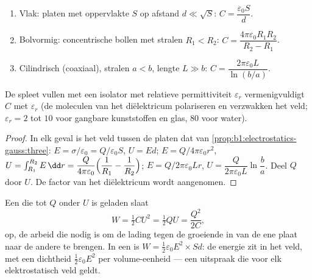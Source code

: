 \begin{proposition}\label{prop:b1:potential-capacitors:three}
\begin{enumerate}
  \item Vlak: platen met oppervlakte $S$ op afstand $d \ll \sqrt S$:
        $C = \dfrac{\varepsilon_0S}{d}$.
  \item Bolvormig: concentrische bollen met stralen $R_1 < R_2$:
        $C = \dfrac{4\pi\varepsilon_0R_1R_2}{R_2 - R_1}$.
  \item Cilindrisch (coaxiaal), stralen $a < b$, lengte $L \gg b$:
        $C = \dfrac{2\pi\varepsilon_0L}{\ln(b/a)}$.
\end{enumerate}
De spleet vullen met een isolator met relatieve permittiviteit
$\varepsilon_r$ vermenigvuldigt $C$ met $\varepsilon_r$ (de moleculen van het diëlektricum
polariseren en verzwakken het veld; $\varepsilon_r = 2$ tot $10$ voor gangbare
kunststoffen en glas, $80$ voor water).
\end{proposition}

\begin{proof}
In elk geval is het veld tussen de platen dat van
\cref{prop:b1:electrostatics-gauss:three}: $E = \sigma/\varepsilon_0 = Q/\varepsilon_0S$,
$U = Ed$; $E = Q/4\pi\varepsilon_0r^2$, $U = \int_{R_1}^{R_2}E\,\dd r = \dfrac{Q}{4\pi\varepsilon_0}
\Bigl(\dfrac1{R_1} - \dfrac1{R_2}\Bigr)$; $E = Q/2\pi\varepsilon_0Lr$, $U =
\dfrac{Q}{2\pi\varepsilon_0L}\ln\dfrac ba$. Deel $Q$ door $U$. De factor van het
diëlektricum wordt aangenomen.
\end{proof}

\begin{theorem}\label{thm:b1:potential-capacitors:energy}
Een  die tot $Q$ onder $U$ is geladen slaat
\[
W = \tfrac12 CU^2 = \tfrac12 QU = \frac{Q^2}{2C} ,
\]
op, de arbeid die nodig is om de lading tegen de groeiende  in
van de ene plaat naar de andere te brengen. In een  is $W = \tfrac12\varepsilon_0E^2
\times Sd$: de energie zit in het veld, met een dichtheid $\tfrac12\varepsilon_0E^2$
per volume-eenheid --- een uitspraak die voor elk elektrostatisch veld
geldt.
\end{theorem}

